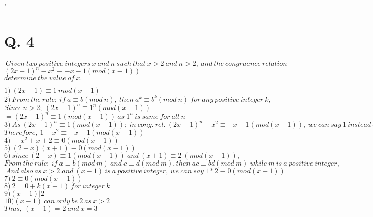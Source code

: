 " \documentclass[10pt]{article}
\begin{document}
\section*{Q. 4}
\begin{center}
 $\ Given \ two \ positive \ integers \ x \ and \ n \ such \ that \ x > 2 \ and \ n > 2, \ and \ the \ congruence \ relation$\\
 $(2x-1)^n-x^2 \equiv -x-1 (mod(x-1))$\\
 $determine \ the \ value \ of \ x.$
\end{center}
$1) \ (2x-1) \equiv 1 \ mod(x-1)$\\
$2) \ From \ the \ rule; \ if  \ a \equiv b (mod \ n), \ then \ a^k  \equiv b^k(mod \ n) \ for \ any \ positive \ integer \ k, $\\
$Since \ n>2; \ (2x-1)^n \equiv 1^n(mod(x-1))$\\
$=(2x-1)^n  \equiv 1(mod(x-1)) \ as \ 1^n \ is \ same \ for \ all \ n$\\
$ 3) \ As \ (2x-1)^n  \equiv 1(mod(x-1)); \ in \ cong. \ rel. \ (2x-1)^n-x^2 \equiv -x-1 (mod(x-1)), \ we \ can \ say \ 1 \ instead \ of \ (2x-1)^n$\\
$ Therefore, \ 1-x^2 \equiv -x-1(mod(x-1))$\\
$4) \  -x^2 +x+2 \equiv 0(mod(x-1))$\\
$5) \ (2-x)(x+1) \equiv 0(mod(x-1))$\\ 
$6) \ since \ (2-x) \equiv 1 (mod(x-1)) \ and \ (x+1) \equiv 2\ (mod(x-1)),$\\
$From \ the \ rule; \ if \ a \equiv b (mod \ m) \ and \ c \equiv d (mod \ m), then \ ac \equiv bd (mod \ m) \ while \ m \ is \ a \ positive \ integer,$\\
$\ And \ also \ as \ x>2 \ and \ (x-1) \ is \ a \ positive \ integer, \ we \ can \ say \ 1*2 \equiv 0 (mod(x-1))$\\
$7) \ 2 \equiv 0(mod(x-1))$\\
$8) \ 2=0+k(x-1) \ for \ integer \ k$\\
$9) (x-1) | 2$\\
$10) (x-1) \ can \ only \ be \ 2 \ as \ x>2$\\ 
$Thus, \ (x-1)=2 \ and \ x=3$\\ 





\end{document}
